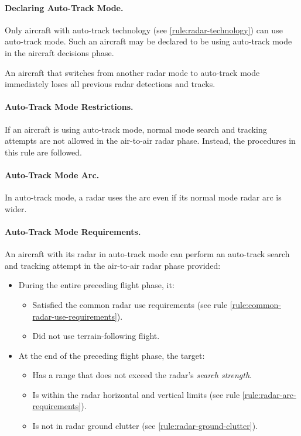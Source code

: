 {\begin{advancedrules}
\paragraph{Declaring Auto-Track Mode.} Only aircraft with auto-track technology (see \ref{rule:radar-technology}) can use auto-track mode. Such an aircraft may be declared to be using auto-track mode in the aircraft decisions phase. 

An aircraft that switches from another radar mode to auto-track mode immediately loses all previous radar detections and tracks. 

\paragraph{Auto-Track Mode Restrictions.}
If an aircraft is using auto-track mode, normal mode search and tracking attempts are not allowed in the air-to-air radar phase. Instead, the procedures in this rule are followed.

\paragraph{Auto-Track Mode Arc.} 
In auto-track mode, a radar uses the  arc even if its normal mode radar arc is wider.

\paragraph{Auto-Track Mode Requirements.} 
An aircraft with its radar in auto-track mode can perform an auto-track search and tracking attempt in the air-to-air radar phase provided:

\begin{itemize}

\item During the entire preceding flight phase, it:
    \begin{itemize}
    \item Satisfied the common radar use requirements (see rule \ref{rule:common-radar-use-requirements}).
    \item Did not use terrain-following flight.
    \end{itemize}
\item At the end of the preceding flight phase, the target:
\begin{itemize}
    \item Has a range that does not exceed the radar's \emph{search strength}.
    \item Is within the radar horizontal and vertical limits (see rule \ref{rule:radar-arc-requirements}).
    \item Is not in radar ground clutter (see  \ref{rule:radar-ground-clutter}).
\end{itemize}


\end{itemize}
\end{advancedrules}}

